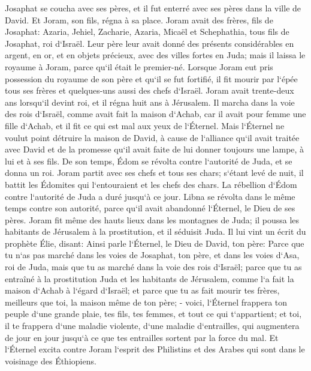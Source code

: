 \verse Josaphat se coucha avec ses pères, et il fut enterré avec ses pères dans la ville de David. Et Joram, son fils, régna à sa place. 
\verse Joram avait des frères, fils de Josaphat: Azaria, Jehiel, Zacharie, Azaria, Micaël et Schephathia, tous fils de Josaphat, roi d`Israël. 
\verse Leur père leur avait donné des présents considérables en argent, en or, et en objets précieux, avec des villes fortes en Juda; mais il laissa le royaume à Joram, parce qu`il était le premier-né. 
\verse Lorsque Joram eut pris possession du royaume de son père et qu`il se fut fortifié, il fit mourir par l`épée tous ses frères et quelques-uns aussi des chefs d`Israël. 
\verse Joram avait trente-deux ans lorsqu`il devint roi, et il régna huit ans à Jérusalem. 
\verse Il marcha dans la voie des rois d`Israël, comme avait fait la maison d`Achab, car il avait pour femme une fille d`Achab, et il fit ce qui est mal aux yeux de l`Éternel. 
\verse Mais l`Éternel ne voulut point détruire la maison de David, à cause de l`alliance qu`il avait traitée avec David et de la promesse qu`il avait faite de lui donner toujours une lampe, à lui et à ses fils. 
\verse De son temps, Édom se révolta contre l`autorité de Juda, et se donna un roi. 
\verse Joram partit avec ses chefs et tous ses chars; s`étant levé de nuit, il battit les Édomites qui l`entouraient et les chefs des chars. 
\verse La rébellion d`Édom contre l`autorité de Juda a duré jusqu`à ce jour. Libna se révolta dans le même temps contre son autorité, parce qu`il avait abandonné l`Éternel, le Dieu de ses pères. 
\verse Joram fit même des hauts lieux dans les montagnes de Juda; il poussa les habitants de Jérusalem à la prostitution, et il séduisit Juda. 
\verse Il lui vint un écrit du prophète Élie, disant: Ainsi parle l`Éternel, le Dieu de David, ton père: Parce que tu n`as pas marché dans les voies de Josaphat, ton père, et dans les voies d`Asa, roi de Juda, 
\verse mais que tu as marché dans la voie des rois d`Israël; parce que tu as entraîné à la prostitution Juda et les habitants de Jérusalem, comme l`a fait la maison d`Achab à l`égard d`Israël; et parce que tu as fait mourir tes frères, meilleurs que toi, la maison même de ton père; - 
\verse voici, l`Éternel frappera ton peuple d`une grande plaie, tes fils, tes femmes, et tout ce qui t`appartient; 
\verse et toi, il te frappera d`une maladie violente, d`une maladie d`entrailles, qui augmentera de jour en jour jusqu`à ce que tes entrailles sortent par la force du mal. 
\verse Et l`Éternel excita contre Joram l`esprit des Philistins et des Arabes qui sont dans le voisinage des Éthiopiens. 
